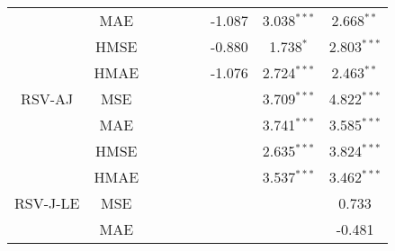 \documentclass[10pt]{article}
\begin{document}
\begin{landscape}
\begin{center}
\begin{tabular}{c|c|ccccccc}
                       &  MAE            &                    &                                 &                                 &                                   &-1.087                          &3.038$^{\ast \ast \ast}$&2.668$^{\ast \ast}$            \\
                       &  HMSE          &                    &                                 &                                 &                                  &-0.880                             &1.738$^{\ast}$            &2.803$^{\ast \ast \ast}$            \\
                       &  HMAE          &                    &                                &                                  &                                  & -1.076                           &2.724$^{\ast \ast \ast}$&2.463$^{\ast \ast}$            \\  \hline 
RSV-AJ           &  MSE            &                    &                                &                                  &                                  &                                     &3.709$^{\ast \ast \ast}$ &4.822$^{\ast \ast \ast}$           \\
                       &  MAE            &                    &                                &                                  &                                  &                                     &3.741$^{\ast \ast \ast}$  & 3.585$^{\ast \ast \ast}$            \\
                       &  HMSE          &                    &                                &                                  &                                  &                                     &2.635$^{\ast \ast \ast}$  & 3.824$^{\ast \ast \ast}$             \\
                       &  HMAE          &                    &                                &                                  &                                  &                                     &3.537$^{\ast \ast \ast}$  &3.462$^{\ast \ast \ast}$            \\  \hline
RSV-J-LE        &  MSE            &                    &                                &                                  &                                  &                                     &                                      &0.733             \\
                       &  MAE            &                    &                                &                                  &                                  &                                     &                                   &-0.481             \\

\end{tabular}
\end{center}
\end{landscape}
\end{document}
